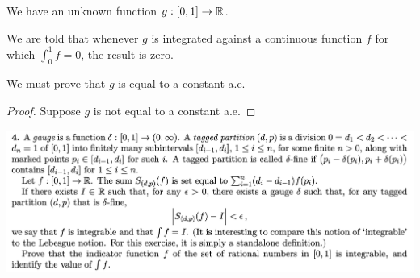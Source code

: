 \begin{intuition}
  We have an unknown function $g: [0, 1] \to \mathbb{R}$.

  We are told that whenever $g$ is integrated against a continuous function $f$ for which $\int_0^1 f = 0$, the
  result is zero.

  We must prove that $g$ is equal to a constant a.e.


\end{intuition}

\begin{proof}
  Suppose $g$ is not equal to a constant a.e.

\end{proof}


\newpage
\begin{mdframed}
\includegraphics[width=400pt]{img/analysis--berkeley-202a-hw09-955c.png}
\end{mdframed}

